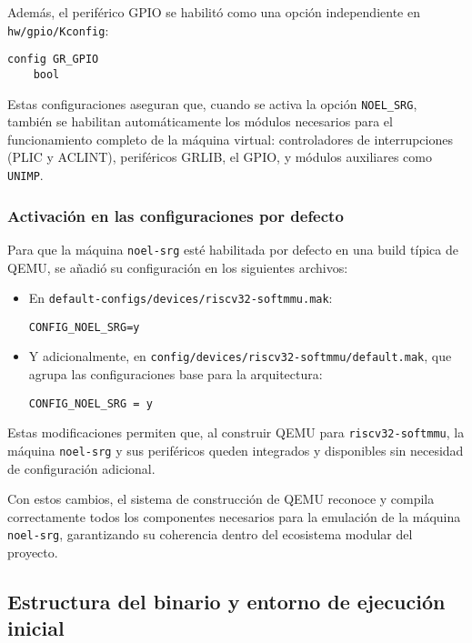 Además, el periférico GPIO se habilitó como una opción independiente en \texttt{hw/gpio/Kconfig}:

\begin{verbatim}
config GR_GPIO
    bool
\end{verbatim}

Estas configuraciones aseguran que, cuando se activa la opción \texttt{NOEL\_SRG}, también se habilitan automáticamente los módulos necesarios para el funcionamiento completo de la máquina virtual: controladores de interrupciones (PLIC y ACLINT), periféricos GRLIB, el GPIO, y módulos auxiliares como \texttt{UNIMP}.

\subsubsection*{Activación en las configuraciones por defecto}

Para que la máquina \texttt{noel-srg} esté habilitada por defecto en una build típica de QEMU, se añadió su configuración en los siguientes archivos:

\begin{itemize}
    \item En \texttt{default-configs/devices/riscv32-softmmu.mak}:
    \begin{verbatim}
CONFIG_NOEL_SRG=y
    \end{verbatim}
    
    \item Y adicionalmente, en \texttt{config/devices/riscv32-softmmu/default.mak}, que agrupa las configuraciones base para la arquitectura:
    \begin{verbatim}
CONFIG_NOEL_SRG = y
    \end{verbatim}
\end{itemize}

Estas modificaciones permiten que, al construir QEMU para \texttt{riscv32-softmmu}, la máquina \texttt{noel-srg} y sus periféricos queden integrados y disponibles sin necesidad de configuración adicional.

\vspace{1em}
Con estos cambios, el sistema de construcción de QEMU reconoce y compila correctamente todos los componentes necesarios para la emulación de la máquina \texttt{noel-srg}, garantizando su coherencia dentro del ecosistema modular del proyecto.

\subsection{Estructura del binario y entorno de ejecución inicial}
\label{subsec:estructura-binario}

